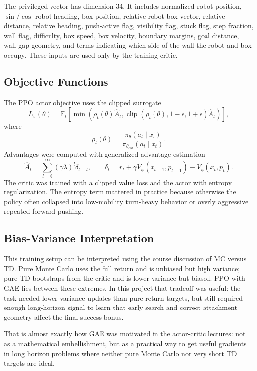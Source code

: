 \documentclass[11pt]{article}
\begin{document}
The privileged vector has dimension 34. It includes normalized robot position,
\(\sin/\cos\) robot heading, box position, relative robot-box vector, relative distance,
relative heading, push-active flag, visibility flag, stuck flag, step fraction, wall flag,
difficulty, box speed, box velocity, boundary margins, goal distance, wall-gap geometry,
and terms indicating which side of the wall the robot and box occupy. These inputs are
used only by the training critic.

\subsection{Objective Functions}

The PPO actor objective uses the clipped surrogate
\[
  L_{\pi}(\theta)=
  \mathbb{E}_t\left[
    \min\left(
      \rho_t(\theta)\hat{A}_t,
      \operatorname{clip}(\rho_t(\theta),1-\epsilon,1+\epsilon)\hat{A}_t
    \right)
  \right],
\]
where
\[
  \rho_t(\theta)=
  \frac{\pi_\theta(a_t\mid x_t)}{\pi_{\theta_{\text{old}}}(a_t\mid x_t)}.
\]
Advantages were computed with generalized advantage estimation:
\[
  \hat{A}_t=
  \sum_{l=0}^{\infty}(\gamma\lambda)^l\delta_{t+l},
  \qquad
  \delta_t=r_t + \gamma V_\psi(x_{t+1},p_{t+1}) - V_\psi(x_t,p_t).
\]
The critic was trained with a clipped value loss and the actor with entropy
regularization. The entropy term mattered in practice because otherwise the policy often
collapsed into low-mobility turn-heavy behavior or overly aggressive repeated forward
pushing.

\subsection{Bias-Variance Interpretation}

This training setup can be interpreted using the course discussion of MC versus TD.
Pure Monte Carlo uses the full return and is unbiased but high variance; pure TD
bootstraps from the critic and is lower variance but biased. PPO with GAE lies between
these extremes. In this project that tradeoff was useful: the task needed lower-variance
updates than pure return targets, but still required enough long-horizon signal to learn
that early search and correct attachment geometry affect the final success bonus.

That is almost exactly how GAE was motivated in the actor-critic lectures: not as a
mathematical embellishment, but as a practical way to get useful gradients in long
horizon problems where neither pure Monte Carlo nor very short TD targets are ideal.
\end{document}
